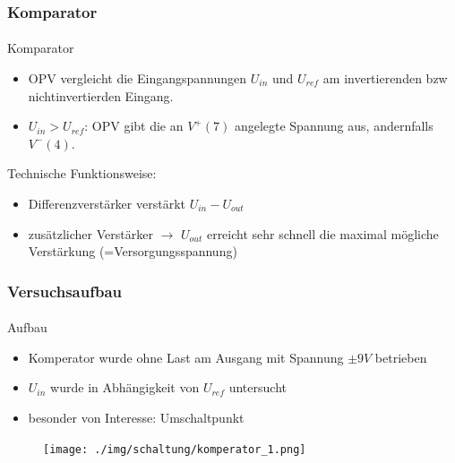\begin{frame}
\frametitle{Komparator}
\framesubtitle{}
    \begin{block}{Komparator}
        \begin{itemize}
            \item OPV vergleicht die Eingangspannungen $U_{in}$ und $U_{ref}$
            am invertierenden bzw nichtinvertierden Eingang.   
            \item $U_{in} > U_{ref}$: OPV gibt die an $V^+ (7)$ angelegte
            Spannung aus, andernfalls $V^- (4)$.
        \end{itemize}
    \end{block}
    \begin{block}{Technische Funktionsweise:}
        \begin{itemize}
            \item Differenzverstärker verstärkt $U_{in} - U_{out}$
            \item zusätzlicher Verstärker $\rightarrow$ $U_{out}$ erreicht sehr schnell die maximal mögliche
            Verstärkung (=Versorgungsspannung)
        \end{itemize}
    \end{block}
\end{frame}

\begin{frame}
\frametitle{Versuchsaufbau}
\framesubtitle{}
    \begin{block}{Aufbau}
         \begin{itemize}
             \item Komperator wurde ohne Last am Ausgang mit Spannung $\pm 9V$
             betrieben
             \item $U_{in}$ wurde in Abhängigkeit von $U_{ref}$ untersucht
             \item besonder von Interesse: Umschaltpunkt
         \end{itemize}
    \end{block}
    \begin{figure}[H]
    \begin{center}
            \texttt{[image: ./img/schaltung/komperator\_1.png]}
    \end{center}
    \end{figure}
\end{frame}

